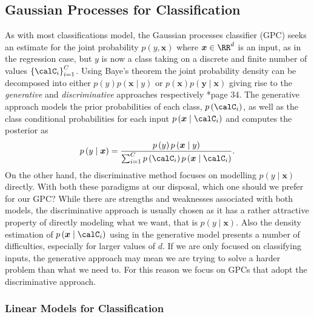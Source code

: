 \subsection{Gaussian Processes for Classification}\label{Section1.6}

As with most classifications model, the Gaussian processes classifier (GPC) seeks an estimate for the joint probability $p \left( y , \bm{x} \right)$ where $\bm{x} \in \RR^d$ is an input, as in the regression case, but $y$ is now a class taking on a discrete and finite number of values $\left\{ \calC_i \right\}_{i=1}^C$. Using Baye's theorem the joint probability density can be decomposed into either $p \left( y \right) p \left( \bm{x} \mid y \right)$ or $p \left( \bm{x} \right) p \left( \bm{y} \mid \bm{x} \right)$ giving rise to the {\it generative} and {\it discriminative} approaches respectively \cite{RasmussenCarlEdward2006Gpfm}*{page 34}. The generative approach models the prior probabilities of each class, $p \left( \calC_i \right)$, as well as the class conditional probabilities for each input $p \left( \bm{x} \mid \calC_i \right)$ and computes the posterior as
\[
    p \left( y \mid \bm{x} \right) = \frac{ p \left( y \right) p \left( \bm{x} \mid y \right) }{ \sum_{i=1}^{C} p \left( \calC_i \right) p \left( \bm{x} \mid \calC_i \right) }.
\]
On the other hand, the discriminative method focuses on modelling $p \left( y \mid \bm{x} \right)$ directly. With both these paradigms at our disposal, which one should we prefer for our GPC? While there are strengths and weaknesses associated with both models, the discriminative approach is usually chosen as it has a rather attractive property of directly modeling what we want, that is $p \left( y \mid \bm{x} \right)$. Also the density estimation of $p \left( \bm{x} \mid \calC_i \right)$ using in the generative model presents a number of difficulties, especially for larger values of $d$. If we are only focused on classifying inputs, the generative approach may mean we are trying to solve a harder problem than what we need to. For this reason we focus on GPCs that adopt the discriminative approach.

\subsubsection{Linear Models for Classification}\label{Section1.6.1}

